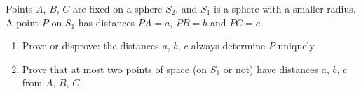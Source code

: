 Points $A$, $B$, $C$ are fixed on a sphere $S_2$, and $S_1$ is a sphere with a smaller radius. A point $P$ on $S_1$ has distances $PA=a$, $PB=b$ and $PC=c$.
\begin{enumerate}
\item[(a)] Prove or disprove: the distances $a$, $b$, $c$ always determine $P$ uniquely.
\item[(b)] Prove that at most two points of space (on $S_1$ or not) have distances $a$, $b$, $c$ from $A$, $B$, $C$.
\end{enumerate}
